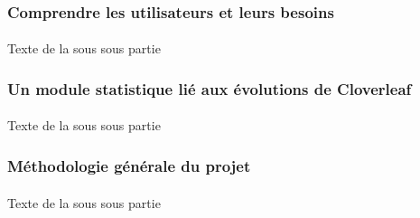 		\subsubsection{Comprendre les utilisateurs et leurs besoins}
			\paragraph{}
			Texte de la sous sous partie
		\subsubsection{Un module statistique lié aux évolutions de Cloverleaf}
			\paragraph{}
			Texte de la sous sous partie
		\subsubsection{Méthodologie générale du projet}
			\paragraph{}
			Texte de la sous sous partie
			